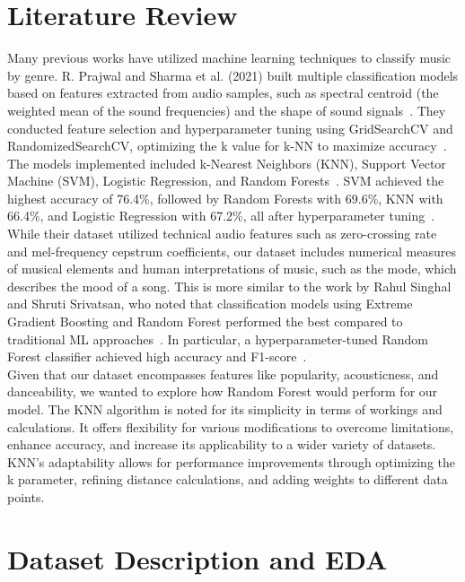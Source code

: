 \documentclass[times, twocolumn]{article}
\begin{document}
\section{Literature Review}
Many previous works have utilized machine learning techniques to classify music by genre. R. Prajwal and Sharma et al. (2021) built multiple classification models based on features extracted from audio samples, such as spectral centroid (the weighted mean of the sound frequencies) and the shape of sound signals~\cite{Singhal2022}. They conducted feature selection and hyperparameter tuning using GridSearchCV and RandomizedSearchCV, optimizing the k value for k-NN to maximize accuracy~\cite{Singhal2022}. The models implemented included k-Nearest Neighbors (KNN), Support Vector Machine (SVM), Logistic Regression, and Random Forests~\cite{Singhal2022}. SVM achieved the highest accuracy of 76.4\%, followed by Random Forests with 69.6\%, KNN with 66.4\%, and Logistic Regression with 67.2\%, all after hyperparameter tuning~\cite{Singhal2022}.\\

While their dataset utilized technical audio features such as zero-crossing rate and mel-frequency cepstrum coefficients, our dataset includes numerical measures of musical elements and human interpretations of music, such as the mode, which describes the mood of a song. This is more similar to the work by Rahul Singhal and Shruti Srivatsan, who noted that classification models using Extreme Gradient Boosting and Random Forest performed the best compared to traditional ML approaches~\cite{prajwal2021music}. In particular, a hyperparameter-tuned Random Forest classifier achieved high accuracy and F1-score~\cite{prajwal2021music}.\\

Given that our dataset encompasses features like popularity, acousticness, and danceability, we wanted to explore how Random Forest would perform for our model. The KNN algorithm is noted for its simplicity in terms of workings and calculations. It offers flexibility for various modifications to overcome limitations, enhance accuracy, and increase its applicability to a wider variety of datasets. KNN's adaptability allows for performance improvements through optimizing the k parameter, refining distance calculations, and adding weights to different data points.

\section{Dataset Description and EDA}
\end{document}
